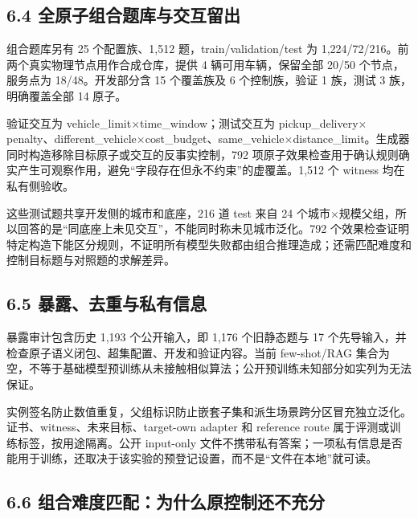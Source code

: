 \documentclass[UTF8,10pt,a4paper,fontset=fandol]{ctexart}
\begin{document}
\subsection*{6.4 全原子组合题库与交互留出}


组合题库另有 25 个配置族、1,512 题，train/\allowbreak{}validation/\allowbreak{}test 为 1,224/\allowbreak{}72/\allowbreak{}216。前两个真实物理节点用作合成仓库，提供 4 辆可用车辆，保留全部 20/\allowbreak{}50 个节点，服务点为 18/\allowbreak{}48。开发部分含 15 个覆盖族及 6 个控制族，验证 1 族，测试 3 族，明确覆盖全部 14 原子。


验证交互为 vehicle\_\allowbreak{}limit\ensuremath{\times}time\_\allowbreak{}window；测试交互为 pickup\_\allowbreak{}delivery\ensuremath{\times}penalty、different\_\allowbreak{}vehicle\ensuremath{\times}cost\_\allowbreak{}budget、same\_\allowbreak{}vehicle\ensuremath{\times}distance\_\allowbreak{}limit。生成器同时构造移除目标原子或交互的反事实控制，792 项原子效果检查用于确认规则确实产生可观察作用，避免“字段存在但永不约束”的虚覆盖。1,512 个 witness 均在私有侧验收。


这些测试题共享开发侧的城市和底座，216 道 test 来自 24 个城市\ensuremath{\times}规模父组，所以回答的是“同底座上未见交互”，不能同时称未见城市泛化。792 个效果检查证明特定构造下能区分规则，不证明所有模型失败都由组合推理造成；还需匹配难度和控制目标题与对照题的求解差异。


\subsection*{6.5 暴露、去重与私有信息}


暴露审计包含历史 1,193 个公开输入，即 1,176 个旧静态题与 17 个先导输入，并检查原子语义闭包、超集配置、开发和验证内容。当前 few-shot/\allowbreak{}RAG 集合为空，不等于基础模型预训练从未接触相似算法；公开预训练未知部分如实列为无法保证。


实例签名防止数值重复，父组标识防止嵌套子集和派生场景跨分区冒充独立泛化。证书、witness、未来目标、target-own adapter 和 reference route 属于评测或训练标签，按用途隔离。公开 input-only 文件不携带私有答案；一项私有信息是否能用于训练，还取决于该实验的预登记设置，而不是“文件在本地”就可读。


\subsection*{6.6 组合难度匹配：为什么原控制还不充分}
\end{document}
